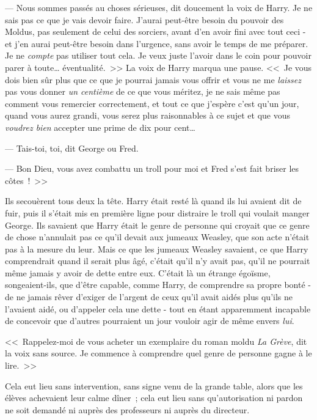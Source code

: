--- Nous sommes passés au choses sérieuses, dit doucement la voix de Harry. Je ne sais pas ce que je vais devoir faire. J'aurai peut-être besoin du pouvoir des Moldus, pas seulement de celui des sorciers, avant d'en avoir fini avec tout ceci - et j'en aurai peut-être besoin dans l'urgence, sans avoir le temps de me préparer. Je ne \emph{compte} pas utiliser tout cela. Je veux juste l'avoir dans le coin pour pouvoir parer à toute… éventualité.~>> La voix de Harry marqua une pause. <<~Je vous dois bien sûr plus que ce que je pourrai jamais vous offrir et vous ne me \emph{laissez} pas vous donner \emph{un centième} de ce que vous méritez, je ne sais même pas comment vous remercier correctement, et tout ce que j'espère c'est qu'un jour, quand vous aurez grandi, vous serez plus raisonnables à ce sujet et que vous \emph{voudrez bien} accepter une prime de dix pour cent…

--- Tais-toi, toi, dit George ou Fred.

--- Bon Dieu, vous avez combattu un troll pour moi et Fred s'est fait briser les côtes~!~>>

Ils secouèrent tous deux la tête. Harry était resté là quand ils lui avaient dit de fuir, puis il s'était mis en première ligne pour distraire le troll qui voulait manger George. Ils savaient que Harry était le genre de personne qui croyait que ce genre de chose n'annulait pas ce qu'il devait aux jumeaux Weasley, que son acte n'était pas à la mesure du leur. Mais ce que les jumeaux Weasley savaient, ce que Harry comprendrait quand il serait plus âgé, c'était qu'il n'y avait pas, qu'il ne pourrait même jamais y avoir de dette entre eux. C'était là un étrange égoïsme, songeaient-ils, que d'être capable, comme Harry, de comprendre sa propre bonté - de ne jamais rêver d'exiger de l'argent de ceux qu'il avait aidés plus qu'ils ne l'avaient aidé, ou d'appeler cela une dette - tout en étant apparemment incapable de concevoir que d'autres pourraient un jour vouloir agir de même envers \emph{lui}.

<<~Rappelez-moi de vous acheter un exemplaire du roman moldu \emph{La Grève}, dit la voix sans source. Je commence à comprendre quel genre de personne gagne à le lire.~>>


Cela eut lieu sans intervention, sans signe venu de la grande table, alors que les élèves achevaient leur calme dîner~; cela eut lieu sans qu'autorisation ni pardon ne soit demandé ni auprès des professeurs ni auprès du directeur.

